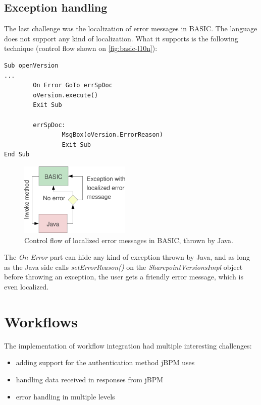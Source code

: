 \subsection{Exception handling}

The last challenge was the localization of error messages in BASIC. The
language does not support any kind of localization. What it supports is the
following technique (control flow shown on \autoref{fig:basic-l10n}):

\begin{lstlisting}
Sub openVersion
...
        On Error GoTo errSpDoc
        oVersion.execute()
        Exit Sub

        errSpDoc:
                MsgBox(oVersion.ErrorReason)
                Exit Sub
End Sub
\end{lstlisting}

\begin{figure}[H]
\centering
\includegraphics[width=200px,keepaspectratio]{basic-l10n.pdf}
\caption{Control flow of localized error messages in BASIC, thrown by Java.}
\label{fig:basic-l10n}
\end{figure}

The \emph{On Error} part can hide any kind of exception thrown by Java, and as
long as the Java side calls \emph{setErrorReason()} on the
\emph{SharepointVersionsImpl} object before throwing an exception, the user gets
a friendly error message, which is even localized.

\section{Workflows}

The implementation of workflow integration had multiple interesting challenges:

\begin{itemize}
\item adding support for the authentication method jBPM uses
\item handling data received in responses from jBPM
\item error handling in multiple levels
\end{itemize}

